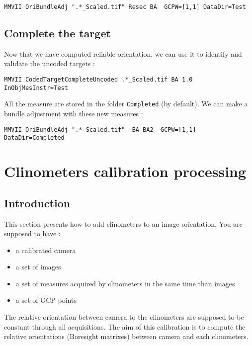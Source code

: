 \begin{lstlisting}
MMVII OriBundleAdj ".*_Scaled.tif" Resec BA  GCPW=[1,1] DataDir=Test
\end{lstlisting}


\subsection{Complete the target}

Now that we have computed reliable  orientation, we can use it to identify and
validate the uncoded targets :

\begin{lstlisting}
MMVII CodedTargetCompleteUncoded .*_Scaled.tif BA 1.0 InObjMesInstr=Test
\end{lstlisting}

All the measure are stored in the  folder {\tt Completed} (by default). We can make a
bundle adjustment with these new measures :

\begin{lstlisting}
MMVII OriBundleAdj ".*_Scaled.tif"  BA BA2  GCPW=[1,1] DataDir=Completed
\end{lstlisting}




\section{Clinometers calibration processing}

\subsection{Introduction}

This section presents how to add clinometers to an image orientation. You are supposed to have :
\begin{itemize}
     \item a calibrated camera
     \item a set of images
     \item a set of measures acquired by clinometers in the same time than images
     \item a set of GCP points
\end{itemize}

The relative orientation between camera to the clinometers are supposed to be constant through all acquisitions.
The aim of this calibration is to compute the relative orientations (Boresight matrixes) between camera and each clinometers.

